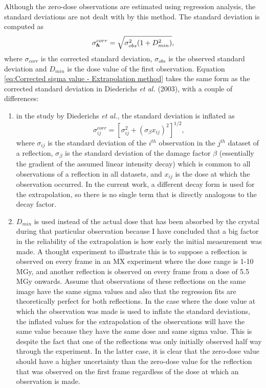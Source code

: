 Although the zero-dose observations are estimated using regression analysis, the standard deviations are not dealt with by this method.
The standard deviation is computed as
\begin{equation}
    \sigma^{corr}_{\boldsymbol{h}} = \sqrt{\sigma^2_{obs}(1 + D^2_{min})},
    \label{eq:Corrected sigma value - Extrapolation method}
\end{equation}
where $\sigma_{corr}$ is the corrected standard deviation, $\sigma_{obs}$ is the observed standard deviation and $D_{min}$ is the dose value of the first observation.
Equation \ref{eq:Corrected sigma value - Extrapolation method} takes the same form as the corrected standard deviation in Diederichs \textit{et al.} (2003), with a couple of differences:
\begin{enumerate}
    \item in the study by Diederichs \textit{et al.}, the standard deviation is inflated as
    \begin{equation}
        \sigma^{corr}_{ij} = \left[ \sigma^2_{ij} + (\sigma_{\beta}x_{ij})^2 \right]^{1/2},
    \end{equation}
    where $\sigma_{ij}$ is the standard deviation of the $i^{th}$ observation in the $j^{th}$ dataset of a reflection, $\sigma_{\beta}$ is the standard deviation of the damage factor $\beta$ (essentially the gradient of the assumed linear intensity decay) which is common to all observations of a reflection in all datasets, and $x_{ij}$ is the dose at which the observation occurred.
    In the current work, a different decay form is used for the extrapolation, so there is no single term that is directly analogous to the decay factor.
    \item $D_{min}$ is used instead of the actual dose that has been absorbed by the crystal during that particular observation because I have concluded that a big factor in the reliability of the extrapolation is how early the initial measurement was made.
    A thought experiment to illustrate this is to suppose a reflection is observed on every frame in an MX experiment where the dose range is 1-10 MGy, and another reflection is observed on every frame from a dose of 5.5 MGy onwards.
    Assume that observations of these reflections on the same image have the same sigma values and also that the regression fits are theoretically perfect for both reflections.
    In the case where the dose value at which the observation was made is used to inflate the standard deviations, the inflated values for the extrapolation of the observations will have the same value because they have the same dose and same sigma value.
    This is despite the fact that one of the reflections was only initially observed half way through the experiment.
    In the latter case, it is clear that the zero-dose value should have a higher uncertainty than the zero-dose value for the reflection that was observed on the first frame regardless of the dose at which an observation is made.
\end{enumerate}

